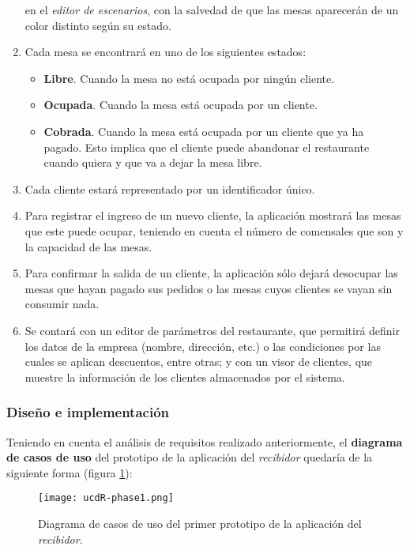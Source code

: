 \begin{enumerate}
en el \emph{editor de escenarios}, con la salvedad de que las mesas aparecerán
de un color distinto según su estado.
\item Cada mesa se encontrará en uno de los siguientes estados:
  \begin{itemize}
  \item \textbf{Libre}. Cuando la mesa no está ocupada por ningún cliente.
  \item \textbf{Ocupada}. Cuando la mesa está ocupada por un cliente.
  \item \textbf{Cobrada}. Cuando la mesa está ocupada por un cliente que ya
  ha pagado. Esto implica que el cliente puede abandonar el restaurante
  cuando quiera y que va a dejar la mesa libre.
  \end{itemize}
\item Cada cliente estará representado por un identificador único.
\item Para registrar el ingreso de un nuevo cliente, la aplicación mostrará
las mesas que este puede ocupar, teniendo en cuenta el número de comensales que
son y la capacidad de las mesas.
\item Para confirmar la salida de un cliente, la aplicación sólo dejará
desocupar las mesas que hayan pagado sus pedidos o las mesas cuyos clientes
se vayan sin consumir nada.
\item Se contará con un editor de parámetros del restaurante, que permitirá
definir los datos de la empresa (nombre, dirección, etc.) o las condiciones
por las cuales se aplican descuentos, entre otras; y con un visor de clientes,
que muestre la información de los clientes almacenados por el sistema.
\end{enumerate}

\subsubsection{Diseño e implementación}
Teniendo en cuenta el análisis de requisitos realizado anteriormente, el
\textbf{diagrama de casos de uso} del prototipo de la aplicación del
\emph{recibidor} quedaría de la siguiente forma (figura \ref{fig:ucdR-phase1}):

  \begin{figure}[H]
    \begin{center}
      \texttt{[image: ucdR-phase1.png]}
      \caption{Diagrama de casos de uso del primer prototipo de la aplicación
      del \emph{recibidor}.}
      \label{fig:ucdR-phase1}
    \end{center}
  \end{figure}

